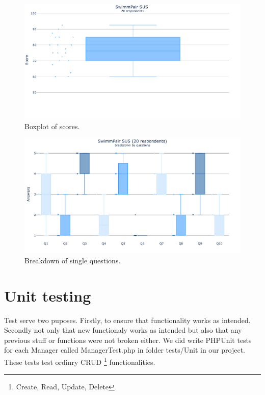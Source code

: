 \begin{figure}[h]	
    \centering	
    \includegraphics[scale=0.257]{img/sus_general.png}
    \caption{Boxplot of scores.}
    \label{fig4.1:susgeneral}
\end{figure}

\begin{figure}[h]	
    \centering	
    \includegraphics[scale=0.256]{img/sus_breakdown.png}
    \caption{Breakdown of single questions.}
    \label{fig4.2:susbreakdown}
\end{figure}
\newpage
\section{Unit testing}
Test serve two puposes. Firstly, to ensure that functionality works as intended. Secondly not only that new functionaly works as intended but also that any previous stuff or functions were not broken either. We did write PHPUnit tests for each Manager called ManagerTest.php in folder tests/Unit in our project. These tests test ordinry CRUD \footnote{Create, Read, Update, Delete} functionalities.
